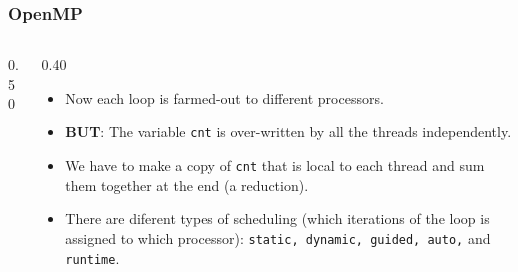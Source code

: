\begin{frame}[fragile]
\frametitle{OpenMP}
\begin{columns}[T]

\pause
\begin{column}{0.50\textwidth}

\end{column}

\pause
\begin{column}{0.40\textwidth}
\begin{itemize}[<+->]
\item Now each loop is farmed-out to different processors.
\item {\bf BUT}: The variable \verb^cnt^ is over-written by all the
threads independently.
\item We have to make a copy of \verb^cnt^ that is local to each thread
and sum them together at the end (a reduction).
\item There are diferent types of scheduling (which iterations of the loop
is assigned to which processor): \verb^static, dynamic, guided, auto,^ and \verb^runtime^.
\end{itemize}
\end{column}

\end{columns}
\end{frame}
